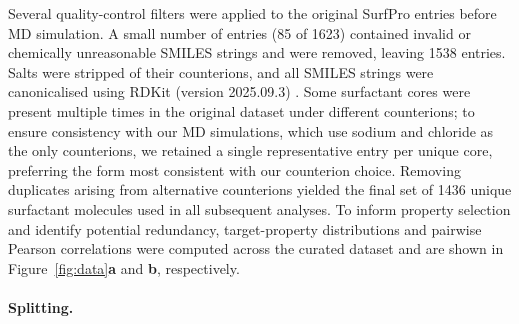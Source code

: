 \documentclass[11pt]{aime}
\begin{document}
Several quality-control filters were applied to the original SurfPro entries before MD simulation.
A small number of entries (85 of 1623) contained invalid or chemically unreasonable SMILES strings and were removed, leaving 1538 entries.
Salts were stripped of their counterions, and all SMILES strings were canonicalised using RDKit (version 2025.09.3) \cite{landrum2006rdkit}.
Some surfactant cores were present multiple times in the original dataset under different counterions;
to ensure consistency with our MD simulations, which use sodium and chloride as the only counterions, we retained a single representative entry per unique core, preferring the form most consistent with our counterion choice.
Removing duplicates arising from alternative counterions yielded the final set of 1436 unique surfactant molecules used in all subsequent analyses.
To inform property selection and identify potential redundancy, target-property distributions and pairwise Pearson correlations were computed across the curated dataset and are shown in Figure~\ref{fig:data}\textbf{a} and \textbf{b}, respectively.

% 
% 


\paragraph{Splitting.}
\end{document}
